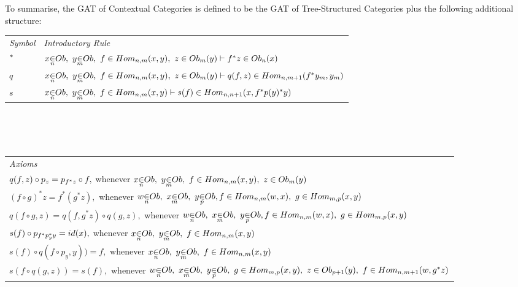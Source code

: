 \documentclass[10pt,a4paper]{scrartcl}
\begin{document}
\noindent To summarise, the GAT of Contextual Categories is defined to be the GAT of Tree-Structured Categories plus
the following additional structure: \\
\vspace{0.1cm} 
\begin{tabular}{>{\itshape}l l}
Symbol & \itshape{Introductory Rule} \\[0.1cm]
$^* $&$ \ofObi{x}{n} ,\  \ofObi{y}{m} ,\  \ofHomij{f}{n}{m}{x}{y} ,\  \ofT{z}{\Obi{m}(y)}
\tstyle \ofT {f \sub z}{\Obi{n}(x) } $\\[0.25cm]
$ q  $&$ \ofObi{x}{n} ,\  \ofObi{y}{m} ,\  \ofHomij{f}{n}{m}{x}{y} ,\  \ofT{z}{\Obi{m}(y)}
\tstyle
                     \ofT{q(f,z)}{  \Homij{n}{m+1}(f\sub y_m  , y_m ) }$  \\ [0.25cm]
$ s  $ & $ \ofObi{x}{n} ,\  \ofObi{y}{m} ,\  \ofHomij{f}{n}{m}{x}{y} \tstyle
                 \ofT{s(f)} {\Homij{n}{n+1}(x,f \sub p (y)  \sub y)} $ \\ [0.25cm]


\end{tabular} \\
\vspace{.1cm}  \\
\vspace{.03cm} \\
\begin{tabular}{l}
\itshape{Axioms} \\
$q(f,z) \circ p_z =p_{f^* z} \circ f,$ 
          whenever $\ofObi{x}{n} ,\  \ofObi{y}{m} ,\  \ofHomij{f}{n}{m}{x}{y} ,\  \ofT{z}{\Obi{m}(y)} $\\  [0.25cm]
					

$(f \circ g)^*z =  f^* (g ^* z), $
          whenever  $ \ofObi{w}{n} ,\ \ofObi{x}{m} ,\ \ofObi{y}{p}, 
					\ofHomij{f}{n}{m}{w}{x} ,\  \ofHomij{g}{m}{p}{x}{y}    $ \\[0.25cm]

$q(f \circ g,z) = q(f,g^*z) \circ q(g,z), $
				   whenever  $ \ofObi{w}{n} ,\ \ofObi{x}{m} ,\ \ofObi{y}{p}, 
					\ofHomij{f}{n}{m}{w}{x} ,\  \ofHomij{g}{m}{p}{x}{y}    $ \\[0.25cm]
					
$s(f) \circ p_{f ^* p_y ^* y} = id(x),$ 
          whenever $\ofObi{x}{n} ,\  \ofObi{y}{m} ,\  \ofHomij{f}{n}{m}{x}{y} $ \\ [0.25cm]
				
$s(f) \circ q( f \circ p_y    ,y))=f, $	
          whenever	$ \ofObi{x}{n} ,\  \ofObi{y}{m} ,\  \ofHomij{f}{n}{m}{x}{y} $ \\ [0.25cm]		
					
$s(f \circ q(g,z))=s(f),$ 
          whenever $\ofObi{w}{n} ,\  \ofObi{x}{m}  ,\   \ofObi{y}{p} ,\    \ofHomij{g}{m}{p}{x}{y} ,\ \ofT{z}{\Obi{p+1}(y)} ,\ \ofHomij{f}{n}{m+1}{w}{g \sub z} $ \\ [0.25cm]				
					
\end{tabular}  \\
\vspace{.1cm}  \\
\vspace{.03cm} \\
\end{document}
